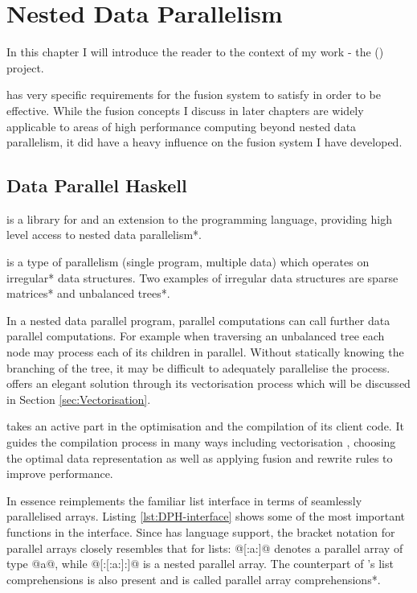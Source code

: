 \documentclass[preamble.tex]{subfiles}
\begin{document}
\clearpage

\chapter{Nested Data Parallelism}
\label{ch:NDP}

In this chapter I will introduce the reader to the context of my work - the  (\DPH) project.\idph

\DPH has very specific requirements for the fusion system to satisfy in order to be effective. While the fusion concepts I discuss in later chapters are widely applicable to areas of high performance computing beyond nested data parallelism, it did have a heavy influence on the fusion system I have developed.


\section{Data Parallel Haskell}
\label{sec:DPH}

\idph is a library for and an extension to the \Haskell programming language, providing high level access to \*nested data parallelism*.

\indp is a type of  parallelism (single program, multiple data) which operates on \*irregular* data structures. Two examples of irregular data structures are \*sparse matrices* and \*unbalanced trees*.

In a nested data parallel program, parallel computations can call further data parallel computations. For example when traversing an unbalanced tree each node may process each of its children in parallel. Without statically knowing the branching of the tree, it may be difficult to adequately parallelise the process. \DPH offers an elegant solution through its vectorisation process which will be discussed in Section \ref{sec:Vectorisation}.

\DPH takes an active part in the optimisation and the compilation of its client code. It guides the compilation process in many ways including vectorisation \cite{PLKC08}, choosing the optimal data representation \cite{InstantGenerics} as well as applying fusion \cite{CLP+07} and rewrite rules \cite{PTH01} to improve performance.

In essence \DPH reimplements the familiar list interface in terms of seamlessly parallelised arrays. Listing \ref{lst:DPH-interface} shows some of the most important functions in the \DPH interface. Since \DPH has language support, the bracket notation for parallel arrays closely resembles that for \Haskell lists: @[:a:]@ denotes a parallel array of type @a@, while @[:[:a:]:]@ is a nested parallel array. The counterpart of \Haskell's list comprehensions is also present and is called \*parallel array comprehensions*.
\end{document}
